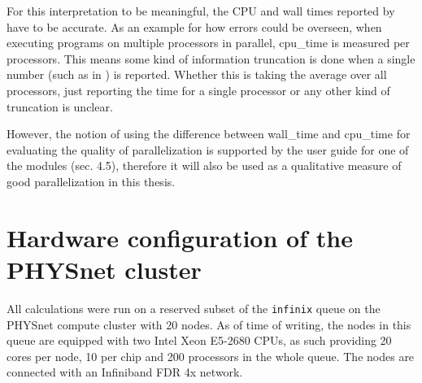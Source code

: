 \documentclass[main.tex]{subfiles}
\begin{document}
For this interpretation to be meaningful, the CPU and wall times reported by \QE have to be accurate.
As an example for how errors could be overseen, when executing programs on multiple processors in parallel, \gls{cpu_time} is measured per processors.
This means some kind of information truncation is done when a single number (such as in \QE) is reported.
Whether this is taking the average over all processors, just reporting the time for a single processor or any other kind of truncation is unclear.

However, the notion of using the difference between \gls{wall_time} and \gls{cpu_time} for evaluating the quality of parallelization is supported by the user guide for one of the \QE modules \cite{noauthor_pwscf_nodate} (sec. 4.5), therefore it will also be used as a qualitative measure of good parallelization in this thesis.

\section{Hardware configuration of the PHYSnet cluster}\label{sec:hardware_physnet}

All calculations were run on a reserved subset of the \texttt{infinix} queue on the PHYSnet compute cluster with 20 nodes.
As of time of writing, the nodes in this queue are equipped with two Intel Xeon E5-2680 CPUs, as such providing 20 cores per node, 10 per chip and 200 processors in the whole queue.
The nodes are connected with an Infiniband FDR 4x network.
\end{document}
